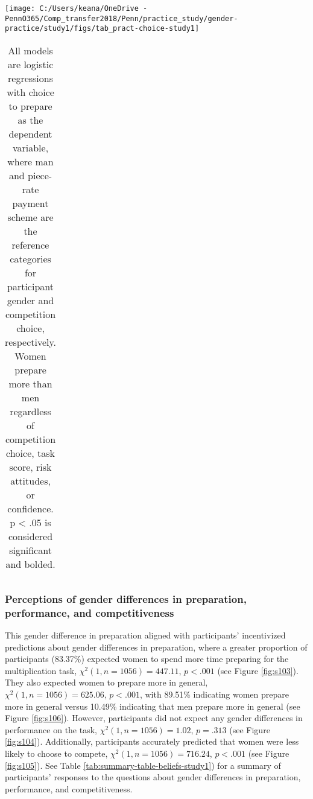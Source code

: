 \documentclass[letterpaper, nobind]{templates/ociamthesis}
\begin{document}
\newpage

\begin{center}\texttt{[image: C:/Users/keana/OneDrive - PennO365/Comp\_transfer2018/Penn/practice\_study/gender-practice/study1/figs/tab\_pract-choice-study1]} \end{center}

\begin{table}[ht]
\centering
\begingroup\fontsize{0.1pt}{0.1pt}\selectfont
\begin{tabular}{r}
   \\ 
 \end{tabular}
\endgroup
\caption{All models are logistic regressions with choice to prepare as the dependent variable, where man and piece-rate payment scheme are the reference categories for participant gender and competition choice, respectively. Women prepare more than men regardless of competition choice, task score, risk attitudes, or confidence. p < .05 is considered significant and bolded.} 
\label{tab:tab-pract-choice-study1}
\end{table}

\hypertarget{perceptions-of-gender-differences-in-preparation-performance-and-competitiveness}{%
\subsubsection{Perceptions of gender differences in preparation, performance, and competitiveness}\label{perceptions-of-gender-differences-in-preparation-performance-and-competitiveness}}

This gender difference in preparation aligned with participants' incentivized predictions about gender differences in preparation, where a greater proportion of participants (83.37\%) expected women to spend more time preparing for the multiplication task, \(\chi^2(1, n = 1056) = 447.11\), \(p < .001\) (see Figure \ref{fig:s103}). They also expected women to prepare more in general, \(\chi^2(1, n = 1056) = 625.06\), \(p < .001\), with 89.51\% indicating women prepare more in general versus 10.49\% indicating that men prepare more in general (see Figure \ref{fig:s106}). However, participants did not expect any gender differences in performance on the task, \(\chi^2(1, n = 1056) = 1.02\), \(p = .313\) (see Figure \ref{fig:s104}). Additionally, participants accurately predicted that women were less likely to choose to compete, \(\chi^2(1, n = 1056) = 716.24\), \(p < .001\) (see Figure \ref{fig:s105}). See Table \ref{tab:summary-table-beliefs-study1}) for a summary of participants' responses to the questions about gender differences in preparation, performance, and competitiveness.
\end{document}
